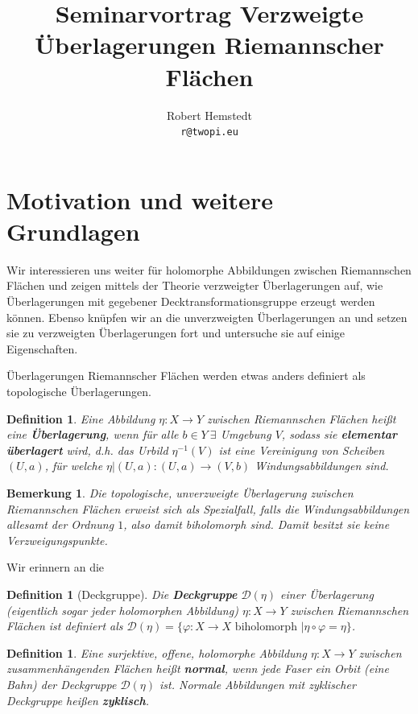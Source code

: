 \documentclass[12pt,a4paper]{article}
\author{Robert Hemstedt \\ \texttt{r@twopi.eu}}
\title{Seminarvortrag Verzweigte Überlagerungen Riemannscher Flächen}
\theoremstyle{plain}
\newtheorem{Definition}[Theorem]{Definition}
\newtheorem{Bemerkung}[Theorem]{Bemerkung}
\newcommand{\herv}[1]{{\emph{\textbf{#1}}}}
\numberwithin{equation}{section}
\begin{document}
\maketitle
\section{Motivation und weitere Grundlagen}
Wir interessieren uns weiter für holomorphe Abbildungen zwischen Riemannschen Flächen und zeigen mittels der Theorie verzweigter Überlagerungen auf, wie Überlagerungen mit gegebener Decktransformationsgruppe erzeugt werden können. Ebenso knüpfen wir an die unverzweigten Überlagerungen an und setzen sie zu verzweigten Überlagerungen fort und untersuche sie auf einige Eigenschaften.

Überlagerungen Riemannscher Flächen werden etwas anders definiert als topologische Über\-la\-ge\-run\-gen.
\begin{Definition} Eine Abbildung $\eta: X \rightarrow Y$ zwischen Riemannschen Flächen heißt eine \herv{Überlagerung}, wenn für alle $b\in Y\ \exists$ Umgebung $V$, sodass sie \herv{elementar überlagert} wird, d.h. das Urbild $\eta^{-1}(V)$ ist eine Vereinigung von Scheiben $(U,a)$, für welche $\eta|(U,a): (U,a) \rightarrow (V,b)$ Windungsabbildungen sind.
\end{Definition}
\begin{Bemerkung} Die topologische, \emph{unverzweigte} Überlagerung zwischen Riemannschen Flä\-chen erweist sich als Spezialfall, falls die Windungsabbildungen allesamt der Ordnung $1$, also damit biholomorph sind. Damit besitzt sie keine Verzweigungspunkte.
\end{Bemerkung}
Wir erinnern an die 
\begin{Definition}[Deckgruppe] Die \herv{Deckgruppe} $\mathcal{D}(\eta)$ einer Überlagerung (eigentlich sogar jeder holomorphen Abbildung) $\eta: X \rightarrow Y$ zwischen Riemannschen Flächen ist definiert als $\mathcal{D}(\eta) = \{ \varphi: X\rightarrow X \text{ biholomorph }|\eta\circ\varphi = \eta \}$.
\end{Definition}
\begin{Definition}Eine surjektive, offene, holomorphe Abbildung $\eta : X \rightarrow Y$ zwischen zusammenhängenden Flächen heißt \herv{normal}, wenn jede Faser ein Orbit (eine Bahn) der Deckgruppe $\mathcal{D(\eta)}$ ist. Normale Abbildungen mit zyklischer Deckgruppe heißen \herv{zyklisch}.
\end{Definition}
\end{document}
